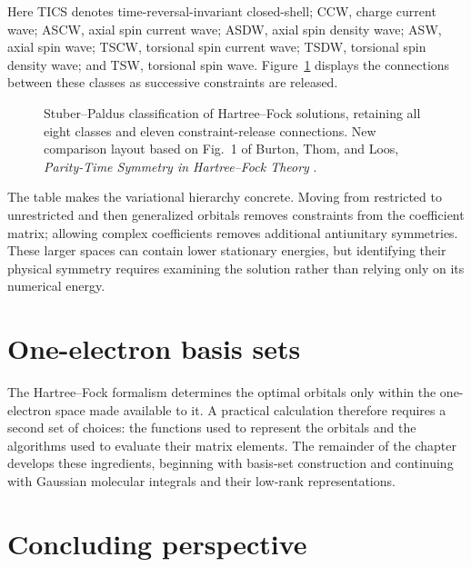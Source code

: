 \documentclass[11pt,a4paper,titlepage]{article}
\numberwithin{equation}{section}
\begin{document}
Here TICS denotes time-reversal-invariant closed-shell; CCW, charge current
wave; ASCW, axial spin current wave; ASDW, axial spin density wave; ASW,
axial spin wave; TSCW, torsional spin current wave; TSDW, torsional spin
density wave; and TSW, torsional spin wave.
Figure~\ref{fig:stuber-paldus} displays the connections between these classes
as successive constraints are released.

\begin{figure}[htbp]
  \centering
  
  \caption{Stuber--Paldus classification of Hartree--Fock
  solutions, retaining all eight classes and eleven constraint-release
  connections. New comparison layout based on Fig.~1 of Burton, Thom, and Loos,
  \emph{Parity-Time Symmetry in Hartree--Fock Theory}
  \citep{BurtonThomLoos2019}.}
  \label{fig:stuber-paldus}
\end{figure}

The table makes the variational hierarchy concrete. Moving from restricted to
unrestricted and then generalized orbitals removes constraints from the
coefficient matrix; allowing complex coefficients removes additional
antiunitary symmetries. These larger spaces can contain lower stationary
energies, but identifying their physical symmetry requires examining the
solution rather than relying only on its numerical energy.


\clearpage
\section{One-electron basis sets}
\label{sec:basis-sets}

The Hartree--Fock formalism determines the optimal orbitals only within the
one-electron space made available to it. A practical calculation therefore
requires a second set of choices: the functions used to represent the
orbitals and the algorithms used to evaluate their matrix elements. The
remainder of the chapter develops these ingredients, beginning with basis-set
construction and continuing with Gaussian molecular integrals and their
low-rank representations.



\section{Concluding perspective}
\label{sec:conclusion}
\end{document}
